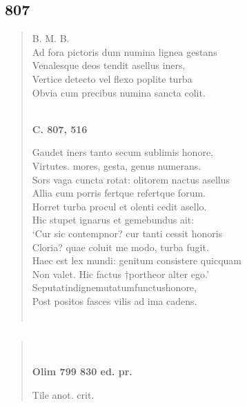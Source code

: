 \documentclass[11pt, a4paper]{report}
\begin{document}
            \subsection*{807}
      \begin{verse}
      B. M. B. \\ Ad fora pictoris dum numina lignea gestans \\ Venalesque deos tendit asellus iners, \\ Vertice detecto vel flexo poplite turba \\ Obvia cum precibus numina sancta colit. \\ 
        ﻿\pagebreak 
     \marginpar{[282]} \begin{center} \textbf{C. 807, 516} \end{center}Gaudet iners tanto secum sublimis honore, \\ Virtutes. mores, gesta, genus numerans. \\ Sors vaga cuncta rotat: olitorem nactus asellus \\ Allia cum porris fertque refertque forum. \\ Horret turba procul et olenti cedit asello. \\ Hic stupet ignarus et gemebundus ait: \\ ‘Cur sic contempnor? cur tanti cessit honoris \\ Cloria? quae coluit me modo, turba fugit. \\ Haec est lex mundi: genitum consistere quicquam \\ Non valet. Hic factus †portheor alter ego.’ \\ Seputatindignemutatumfunctushonore, \\ Post positos fasces vilis ad ima cadens. \\ 
        ﻿\pagebreak 
    
      \end{verse}
  
            \subsection*{}
      \begin{verse}
      \end{verse}
  
            \subsection*{}
      \begin{verse}
        ﻿\pagebreak 
    \begin{center} \textbf{Olim 799 830 ed. pr.} \end{center}Tile anot. crit. \\ 
      \end{verse}
  
\end{document}
